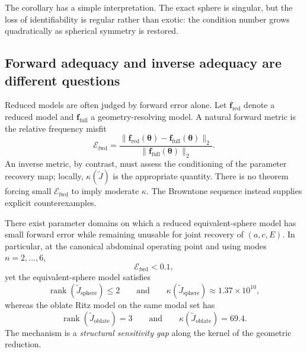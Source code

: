 \noindent The corollary has a simple interpretation.  The exact sphere is
singular, but the loss of identifiability is regular rather than exotic: the
condition number grows quadratically as spherical symmetry is restored.

\subsection{Forward adequacy and inverse adequacy are different questions}

Reduced models are often judged by forward error alone.  Let
$\mathbf{f}_\mathrm{red}$ denote a reduced model and
$\mathbf{f}_\mathrm{full}$ a geometry-resolving model.  A natural forward metric
is the relative frequency misfit
\begin{equation}
  \mathcal{E}_\mathrm{fwd}
  =
  \frac{\|\mathbf{f}_\mathrm{red}(\boldsymbol{\theta})
  - \mathbf{f}_\mathrm{full}(\boldsymbol{\theta})\|_2}
  {\|\mathbf{f}_\mathrm{full}(\boldsymbol{\theta})\|_2}.
  \label{eq:p10_forward_error}
\end{equation}
An inverse metric, by contrast, must assess the conditioning of the parameter
recovery map; locally, $\kappa(\widetilde{J})$ is the appropriate quantity.
There is no theorem forcing small $\mathcal{E}_\mathrm{fwd}$ to imply moderate
$\kappa$.  The Browntone sequence instead supplies explicit counterexamples.

\begin{proposition}
\label{prop:p10_forward_inverse}
There exist parameter domains on which a reduced equivalent-sphere model has
small forward error while remaining unusable for joint recovery of
$(a,c,E)$.  In particular, at the canonical abdominal operating point and using
modes $n=2,\ldots,6$,
\begin{equation}
  \mathcal{E}_\mathrm{fwd} < 0.1,
\end{equation}
yet the equivalent-sphere model satisfies
\begin{equation}
  \operatorname{rank}(\widetilde{J}_\mathrm{sphere}) \leq 2
  \qquad \text{and} \qquad
  \kappa(\widetilde{J}_\mathrm{sphere}) \approx 1.37\times 10^{10},
\end{equation}
whereas the oblate Ritz model on the same modal set has
\begin{equation}
  \operatorname{rank}(\widetilde{J}_\mathrm{oblate}) = 3
  \qquad \text{and} \qquad
  \kappa(\widetilde{J}_\mathrm{oblate}) = 69.4.
\end{equation}
The mechanism is a \emph{structural sensitivity gap} along the kernel of the
geometric reduction.
\end{proposition}

